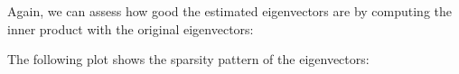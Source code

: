 \documentclass[]{article}
\newenvironment{Shaded}{\begin{snugshade}}{\end{snugshade}}
\newcommand{\KeywordTok}[1]{\textcolor[rgb]{0.13,0.29,0.53}{\textbf{#1}}}
\newcommand{\DecValTok}[1]{\textcolor[rgb]{0.00,0.00,0.81}{#1}}
\newcommand{\StringTok}[1]{\textcolor[rgb]{0.31,0.60,0.02}{#1}}
\newcommand{\CommentTok}[1]{\textcolor[rgb]{0.56,0.35,0.01}{\textit{#1}}}
\newcommand{\OperatorTok}[1]{\textcolor[rgb]{0.81,0.36,0.00}{\textbf{#1}}}
\newcommand{\NormalTok}[1]{#1}
\begin{document}
Again, we can assess how good the estimated eigenvectors are by
computing the inner product with the original eigenvectors:

\begin{Shaded}
\end{Shaded}

The following plot shows the sparsity pattern of the eigenvectors:
\end{document}
